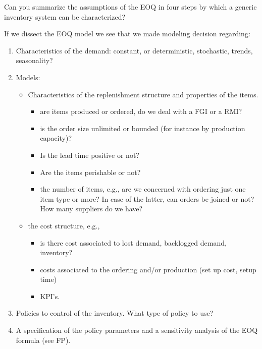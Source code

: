 \begin{question}
  Can you summarize the assumptions of the EOQ in four steps by which
  a generic inventory system can be characterized?
  \begin{solution}
If we dissect the EOQ model we see that we made modeling decision regarding:
\begin{enumerate}
\item Characteristics of the  demand:  constant, or deterministic, stochastic, trends, seasonality?
\item Models: 
  \begin{itemize}
  \item Characteristics of the replenishment structure and properties
    of the items.
  \begin{itemize}
  \item  are items produced or ordered, do we deal with a FGI or a RMI? 
  \item is the order size unlimited or bounded (for instance by
    production capacity)? 
  \item Is the lead time positive or not?
  \item Are the items perishable or not?
  \item the number of items, e.g., are we concerned with ordering just
  one item type or more? In case of the latter, can orders be joined
  or not? How many suppliers do we have?
  \end{itemize}
\item the cost structure, e.g., 
  \begin{itemize}
  \item is there cost associated to lost  demand, backlogged demand, inventory?
  \item costs associated to the ordering and/or production (set up
    cost, setup time)
  \item KPI's.
  \end{itemize}
\end{itemize}
\item Policies to control of the inventory. What type of policy to use? 
\item A specification of the policy parameters and a sensitivity
  analysis of the EOQ formula (see FP).
\end{enumerate}
  \end{solution}
\end{question}


